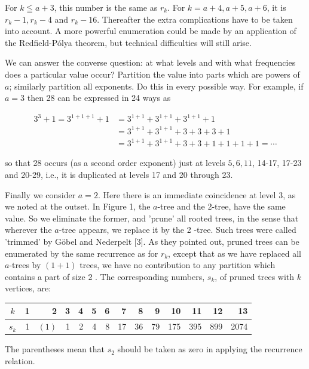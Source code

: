 \documentclass[10pt]{article}
\begin{document}
For $k \leqq a+3$, this number is the same as $r_{k}$. For $k=a+4, a+5, a+6$, it is $r_{k}-1, r_{k}-4$ and $r_{k}-16$. Thereafter the extra complications have to be taken into account. A more powerful enumeration could be made by an application of the Redfield-Pólya theorem, but technical difficulties will still arise.

We can answer the converse question: at what levels and with what frequencies does a particular value occur? Partition the value into parts which are powers of $a$; similarly partition all exponents. Do this in every possible way. For example, if $a=3$ then 28 can be expressed in 24 ways as

$$
\begin{aligned}
3^{3}+1=3^{1+1+1}+1 & =3^{1+1}+3^{1+1}+3^{1+1}+1 \\
& =3^{1+1}+3^{1+1}+3+3+3+1 \\
& =3^{1+1}+3^{1+1}+3+3+1+1+1+1=\cdots
\end{aligned}
$$

so that 28 occurs (as a second order exponent) just at levels $5,6,11$, 14-17, 17-23 and 20-29, i.e., it is duplicated at levels 17 and 20 through 23.

Finally we consider $a=2$. Here there is an immediate coincidence at level 3, as we noted at the outset. In Figure 1, the $a$-tree and the 2-tree, have the same value. So we eliminate the former, and 'prune' all rooted trees, in the sense that wherever the $a$-tree appears, we replace it by the 2 -tree. Such trees were called 'trimmed' by Göbel and Nederpelt [3]. As they pointed out, pruned trees can be enumerated by the same recurrence as for $r_{k}$, except that as we have replaced all $a$-trees by $(1+1)$ trees, we have no contribution to any partition which contains a part of size 2 . The corresponding numbers, $s_{k}$, of pruned trees with $k$ vertices, are:

\begin{center}
\begin{tabular}{c|rrrrrrrrrrrrr}
$k$ & 1 & 2 & 3 & 4 & 5 & 6 & 7 & 8 & 9 & 10 & 11 & 12 & 13 \\
\hline
$s_{k}$ & 1 & $(1)$ & 1 & 2 & 4 & 8 & 17 & 36 & 79 & 175 & 395 & 899 & 2074 \\
\hline
\end{tabular}
\end{center}

The parentheses mean that $s_{2}$ should be taken as zero in applying the recurrence relation.
\end{document}
